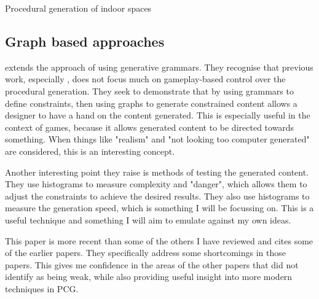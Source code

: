 \documentclass[review]{cmpreport}
\begin{document}
\begin{section}{Procedural generation of indoor spaces}
\subsection{Graph based approaches}
\cite{van2013designing} extends the approach of using generative grammars. They recognise that previous work, especially \cite{sbpcg}, does not focus much on gameplay-based control over the procedural generation. They seek to demonstrate that by using grammars to define constraints, then using graphs to generate constrained content allows a designer to have a hand on the content generated. This is especially useful in the context of games, because it allows generated content to be directed towards something. When things like "realism" and "not looking too computer generated" are considered, this is an interesting concept. \par
Another interesting point they raise is methods of testing the generated content. They use histograms to measure complexity and "danger", which allows them to adjust the constraints to achieve the desired results. They also use histograms to measure the generation speed, which is something I will be focussing on. This is a useful technique and something I will aim to emulate against my own ideas. \par
This paper is more recent than some of the others I have reviewed and cites some of the earlier papers. They specifically address some shortcomings in those papers. This gives me confidence in the areas of the other papers that did not identify as being weak, while also providing useful insight into more modern techniques in PCG. 

\end{section}
\end{document}

